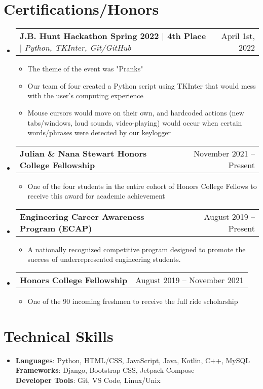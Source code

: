 \documentclass[letterpaper,11pt]{article}
\makeatletter
\newcommand{\resumeItem}[1]{
  \item\small{
    {#1 \vspace{-2pt}}
  }
}
\newcommand{\resumeProjectHeading}[2]{
    \item
    \begin{tabular*}{0.97\textwidth}{l@{\extracolsep{\fill}}r}
      \small#1 & #2 \\
    \end{tabular*}\vspace{-7pt}
}
\newcommand{\resumeItemListStart}{\begin{itemize}}
\newcommand{\resumeItemListEnd}{\end{itemize}\vspace{-5pt}}
\makeatother
\begin{document}
\section{Certifications/Honors}
\begin{itemize}[leftmargin=0.15in, label={}]
  \small
    \resumeProjectHeading
      {\textbf{J.B. Hunt Hackathon Spring 2022 $\mid$ 4th Place} $\mid$ \emph{Python, TKInter, Git/GitHub}}{April 1st, 2022}
        \resumeItemListStart
            \resumeItem{The theme of the event was "Pranks"}
            \resumeItem{Our team of four created a Python script using TKInter that would mess with the user's computing experience}
            \resumeItem{Mouse cursors would move on their own, and hardcoded actions (new tabs/windows, loud sounds, video-playing) would occur when certain words/phrases were detected by our keylogger}
        \resumeItemListEnd
    \resumeProjectHeading
      {\textbf{Julian \& Nana Stewart Honors College Fellowship}}{November 2021 -- Present}
        \resumeItemListStart
            \resumeItem{One of the four students in the entire cohort of Honors College Fellows to receive this award for academic achievement}
        \resumeItemListEnd
    \resumeProjectHeading
      {\textbf{Engineering Career Awareness Program (ECAP)}}{August 2019 -- Present}
        \resumeItemListStart
            \resumeItem{A nationally recognized competitive program designed to promote the success of underrepresented engineering students.}
        \resumeItemListEnd
    \resumeProjectHeading
      {\textbf{Honors College Fellowship}}{August 2019 -- November 2021}
        \resumeItemListStart
            \resumeItem{One of the 90 incoming freshmen to receive the full ride scholarship}
        \resumeItemListEnd
\end{itemize}

\section{Technical Skills}
 \begin{itemize}[leftmargin=0.15in, label={}]
    \item{\small
     \textbf{Languages}{: Python, HTML/CSS, JavaScript, Java, Kotlin, C++, MySQL} \\
     \textbf{Frameworks}{: Django, Bootstrap CSS, Jetpack Compose} \\
     \textbf{Developer Tools}{: Git, VS Code, Linux/Unix} \\
    }
 \end{itemize}
\end{document}
